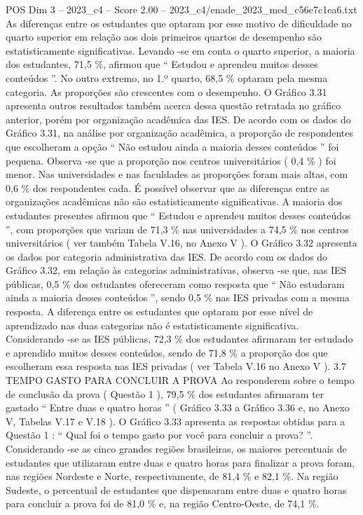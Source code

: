 \begin{textsample}{POS Dim 3 – 2023\_c4 – Score 2.00 – 2023\_c4/enade\_2023\_med\_c56e7c1ea6.txt}
As diferenças entre os estudantes que optaram por esse motivo de dificuldade no quarto superior em relação aos dois primeiros quartos de desempenho são estatisticamente significativas.
Levando -se em conta o quarto superior, a maioria dos estudantes, 71,5 \%, afirmou que “ Estudou e aprendeu muitos desses conteúdos ”.
No outro extremo, no 1.º quarto, 68,5 \% optaram pela mesma categoria.
As proporções são crescentes com o desempenho.
O Gráfico 3.31 apresenta outros resultados também acerca dessa questão retratada no gráfico anterior, porém por organização acadêmica das IES.
De acordo com os dados do Gráfico 3.31, na análise por organização acadêmica, a proporção de respondentes que escolheram a opção “ Não estudou ainda a maioria desses conteúdos ” foi pequena.
Observa -se que a proporção nos centros universitários ( 0,4 \% ) foi menor.
Nas universidades e nas faculdades as proporções foram mais altas, com 0,6 \% dos respondentes cada.
É possível observar que as diferenças entre as organizações acadêmicas não são estatisticamente significativas.
A maioria dos estudantes presentes afirmou que “ Estudou e aprendeu muitos desses conteúdos ”, com proporções que variam de 71,3 \% nas universidades a 74,5 \% nos centros universitários ( ver também Tabela V.16, no Anexo V ).
O Gráfico 3.32 apresenta os dados por categoria administrativa das IES.
De acordo com os dados do Gráfico 3.32, em relação às categorias administrativas, observa -se que, nas IES públicas, 0,5 \% dos estudantes ofereceram como resposta que “ Não estudaram ainda a maioria desses conteúdos ”, sendo 0,5 \% nas IES privadas com a mesma resposta.
A diferença entre os estudantes que optaram por esse nível de aprendizado nas duas categorias não é estatisticamente significativa.
Considerando -se as IES públicas, 72,3 \% dos estudantes afirmaram ter estudado e aprendido muitos desses conteúdos, sendo de 71,8 \% a proporção dos que escolheram essa resposta nas IES privadas ( ver Tabela V.16 no Anexo V ). 3.7 TEMPO GASTO PARA CONCLUIR A PROVA Ao responderem sobre o tempo de conclusão da prova ( Questão 1 ), 79,5 \% dos estudantes afirmaram ter gastado “ Entre duas e quatro horas ” ( Gráfico 3.33 a Gráfico 3.36 e, no Anexo V, Tabelas V.17 e V.18 ).
O Gráfico 3.33 apresenta as respostas obtidas para a Questão 1 : “ Qual foi o tempo gasto por você para concluir a prova? ”.
Considerando -se as cinco grandes regiões brasileiras, os maiores percentuais de estudantes que utilizaram entre duas e quatro horas para finalizar a prova foram, nas regiões Nordeste e Norte, respectivamente, de 81,4 \% e 82,1 \%.
Na região Sudeste, o percentual de estudantes que dispensaram entre duas e quatro horas para concluir a prova foi de 81,0 \% e, na região Centro-Oeste, de 74,1 \%.

\end{textsample}
